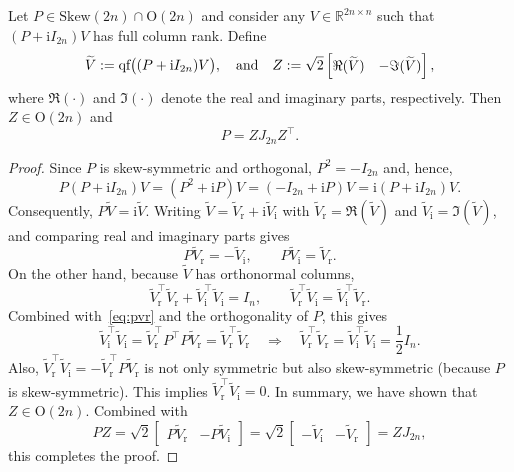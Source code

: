 \documentclass[10pt,a4paper]{amsart}
\begin{document}
\begin{theorem} \label{thm:qfactor}
Let $P\in\mathrm{Skew}(2n)\cap\mathrm{O}(2n)$ and consider any
$V\in\mathbb{R}^{2n\times n}$ such that
$(P+\mathrm{i}I_{2n})V$ has full column rank. Define
\[
    \widetilde V:=\text{\emph{\texttt{qf}}}\bigl((P+\mathrm{i}I_{2n})V\bigr), \quad \text{and} \quad
    Z:=\sqrt{2}
    \begin{bmatrix}
        \Re(\widetilde V) & -\Im(\widetilde V)
    \end{bmatrix},
\]
where $\Re(\cdot)$ and $\Im(\cdot)$ denote the real and imaginary parts, respectively.
Then $Z\in\mathrm{O}(2n)$ and
\[
    P=ZJ_{2n}Z^\top.
\]
\end{theorem}

\begin{proof}
Since $P$ is skew-symmetric and orthogonal, 
$P^2=-I_{2n}$ and, hence, 
\[  
    P(P+\mathrm{i}I_{2n})V
    =(P^2+\mathrm{i}P)V
    =(-I_{2n}+\mathrm{i}P)V
    =\mathrm{i}(P+\mathrm{i}I_{2n})V.
\]
Consequently,
$
    P\widetilde V=\mathrm{i}\widetilde V.
$
Writing $\widetilde V=\widetilde{V}_\mathrm{r}+\mathrm{i}\widetilde{V}_\mathrm{i}$ with $\widetilde{V}_\mathrm{r} = \Re(\widetilde V)$ and 
$\widetilde{V}_\mathrm{i} = \Im(\widetilde V)$, and comparing real and imaginary
parts gives
\begin{equation} \label{eq:pvr}
     P\widetilde{V}_\mathrm{r} =-\widetilde{V}_\mathrm{i},
    \qquad
    P\widetilde{V}_\mathrm{i} = \widetilde{V}_\mathrm{r}.
\end{equation}
On the other hand, because $\widetilde V$ has orthonormal columns,
\[
    \widetilde{V}_\mathrm{r}^\top \widetilde{V}_\mathrm{r}+\widetilde{V}_\mathrm{i}^\top \widetilde{V}_\mathrm{i}=I_n,
    \qquad
    \widetilde{V}_\mathrm{r}^\top \widetilde{V}_\mathrm{i} = \widetilde{V}_\mathrm{i}^\top \widetilde{V}_\mathrm{r}.
\]
Combined with~\eqref{eq:pvr} and the orthogonality of $P$, this gives
\[
    \widetilde{V}_\mathrm{i}^\top \widetilde{V}_\mathrm{i}=\widetilde{V}_\mathrm{r}^\top P^\top P \widetilde{V}_\mathrm{r}=\widetilde{V}_\mathrm{r}^\top \widetilde{V}_\mathrm{r} \quad \Longrightarrow \quad \widetilde{V}_\mathrm{r}^\top \widetilde{V}_\mathrm{r} = \widetilde{V}_\mathrm{i}^\top \widetilde{V}_\mathrm{i} = \frac12 I_n.
\]
Also, $\widetilde{V}_\mathrm{r}^\top \widetilde{V}_\mathrm{i}=-\widetilde{V}_\mathrm{r}^\top P \widetilde{V}_\mathrm{r}$ is not only symmetric but also skew-symmetric (because $P$ is skew-symmetric). This implies 
$\widetilde{V}_\mathrm{r}^\top \widetilde{V}_\mathrm{i}=0$. In summary, we have shown that $Z\in\mathrm{O}(2n)$.
Combined with
\[
    PZ
    =\sqrt{2}\begin{bmatrix}P \widetilde{V}_\mathrm{r}&-P \widetilde{V}_\mathrm{i}\end{bmatrix}
    =\sqrt{2}\begin{bmatrix}-\widetilde{V}_\mathrm{i}&-\widetilde{V}_\mathrm{r} \end{bmatrix}
    =ZJ_{2n},
\]
this completes the proof.
\end{proof}
\end{document}
